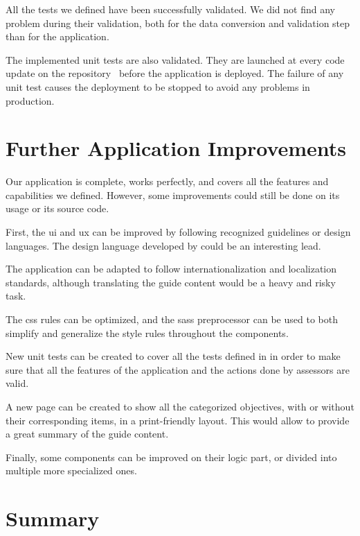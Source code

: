 All the tests we defined have been successfully validated. We did not find any problem during their validation, both for the data conversion and validation step than for the application.

The implemented unit tests are also validated. They are launched at every code update on the repository~\cite{mt-forge} before the application is deployed. The failure of any unit test causes the deployment to be stopped to avoid any problems in production.

\section{Further Application Improvements}
\label{sec:app_improvements}

Our application is complete, works perfectly, and covers all the features and capabilities we defined. However, some improvements could still be done on its usage or its source code.

First, the \gls{ui} and \gls{ux} can be improved by following recognized guidelines or design languages. The  design language developed by  could be an interesting lead.

The application can be adapted to follow internationalization and localization standards, although translating the guide content would be a heavy and risky task.

The \gls{css} rules can be optimized, and the \gls{sass} preprocessor can be used to both simplify and generalize the style rules throughout the components.

New  unit tests can be created to cover all the tests defined in  in order to make sure that all the features of the application and the actions done by assessors are valid.

A new page can be created to show all the categorized objectives, with or without their corresponding items, in a print-friendly layout. This would allow to provide a great summary of the guide content.

Finally, some  components can be improved on their logic part, or divided into multiple more specialized ones.

\section{Summary}
\label{sec:app_summary}

